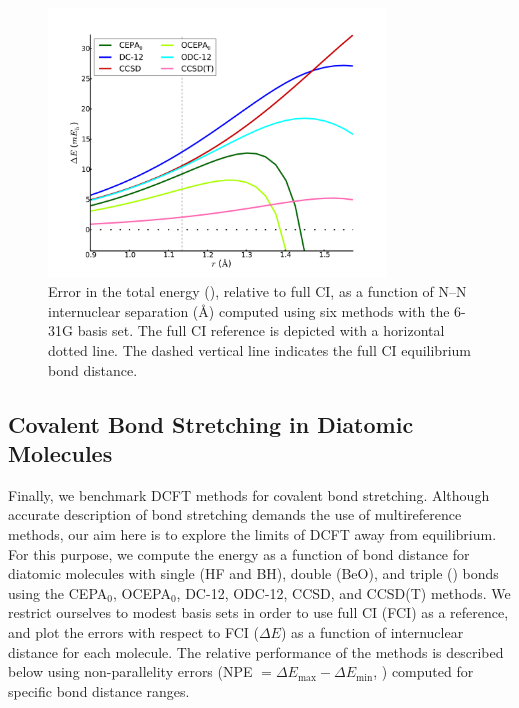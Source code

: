 \begin{figure}
	\centering
	\includegraphics[width=0.8\textwidth]{figures/n2.pdf}
	\caption{%
        \label{n2-f}
        Error in the total energy (\mhartree), relative to full CI, as a
        function of N--N internuclear separation (\AA) computed using six
        methods with the 6-31G basis set.
        The full CI reference is depicted with a horizontal dotted line.
        The dashed vertical line indicates the full CI equilibrium bond
        distance.
	}
\end{figure}



\subsection{Covalent Bond Stretching in Diatomic Molecules}

Finally, we benchmark DCFT methods for covalent bond stretching.
Although accurate description of bond stretching demands the use of
multireference methods, our aim here is to explore the limits of DCFT away from
equilibrium.
For this purpose, we compute the energy as a function of bond distance for
diatomic molecules with single (HF and BH), double (BeO), and triple ()
bonds using the CEPA$_0$, OCEPA$_0$, DC-12, ODC-12, CCSD, and CCSD(T) methods.
We restrict ourselves to modest basis sets in order to use full CI (FCI) as a
reference, and plot the errors with respect to FCI ($\Delta E$) as a function of
internuclear distance for each molecule.
The relative performance of the methods is described below using non-parallelity
errors (NPE $=\Delta E_\mathrm{max}-\Delta E_\mathrm{min}$, \mhartree) computed
for specific bond distance ranges.



